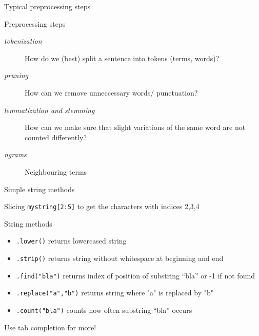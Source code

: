 \documentclass[handout]{beamer}
\begin{document}
\begin{frame}{Typical preprocessing steps}
	\begin{block}{Preprocessing steps}
		\begin{description}
			\item [\emph{tokenization}] How do we (best) split a sentence into tokens (terms, words)?
			\item [\emph{pruning}] How can we remove unneccessary words/ punctuation?
			\item [\emph{lemmatization and stemming}] How can we make sure that slight variations of the same word are not counted differently?
			\item [\emph{ngrams}] Neighbouring terms
		\end{description}
	\end{block}
\end{frame}

\begin{frame}[fragile]{Simple string methods}
	\begin{block}{Slicing}
		\texttt{mystring[2:5]} to get the characters with indices 2,3,4
	\end{block}
	\begin{block}{String methods}
		\begin{itemize}
			\item \texttt{.lower()} returns lowercased string
			\item \texttt{.strip()} returns string without whitespace at beginning and end
			\item \texttt{.find("bla")} returns index of position of substring ``bla'' or -1 if not found
			\item \texttt{.replace("a","b")} returns string where "a" is replaced by "b"
			\item \texttt{.count("bla")} counts how often substring ``bla'' occurs
		\end{itemize}
		Use tab completion for more!
	\end{block}
\end{frame}

\end{document}
